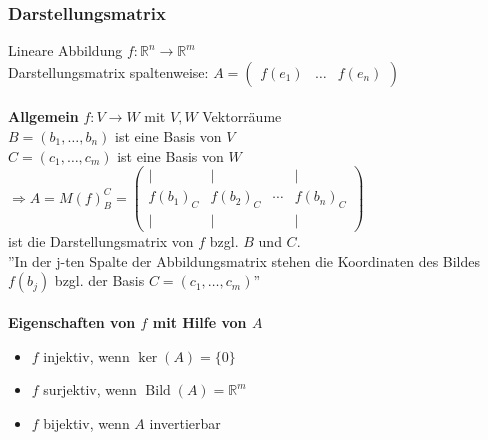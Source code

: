 \documentclass[6pt,a4paper]{scrartcl}
\DeclareMathOperator{\Bild}{Bild}
\begin{document}
\begin{multicols*}{4}
\subsubsection{Darstellungsmatrix}
Lineare Abbildung $f:\mathbb{R}^n \rightarrow \mathbb{R}^m$ \\
Darstellungsmatrix spaltenweise:
$A=\begin{pmatrix}f(e_1) & \dots & f(e_n)
\end{pmatrix} $ \\ \\
\textbf{Allgemein} $f:V\rightarrow W$ mit $V, W$ Vektorräume \\
$B=(b_1,\dots,b_n)$ ist eine Basis von $V$ \\
$C=(c_1,\dots,c_m)$ ist eine Basis von $W$ \\
$\Rightarrow A=M(f)_B^C = \begin{pmatrix}
\vert & \vert &  & \vert \\
f(b_1)_C & f(b_2)_C & \cdots & f(b_n)_C\\
\vert & \vert &  & \vert
\end{pmatrix}$ \\
ist die Darstellungsmatrix von $f$ bzgl. $B$ und $C$. \\
''In der j-ten Spalte der Abbildungsmatrix stehen die Koordinaten des Bildes $f(b_j)$ bzgl. der Basis $C=(c_1,\dots,c_m)$'' \\ \\
\textbf{Eigenschaften von $f$ mit Hilfe von $A$}
\begin{itemize}\itemsep0pt
\item $f$ injektiv, wenn $\ker(A)=\{0\}$
\item $f$ surjektiv, wenn $\Bild(A)=\mathbb{R}^m$
\item $f$ bijektiv, wenn $A$ invertierbar
\end{itemize}

\end{multicols*}
\end{document}
